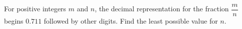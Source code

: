For positive integers $m$ and $n$, the decimal representation for the fraction $\dfrac{m}{n}$ begins $0.711$ followed by other digits. Find the least possible value for $n$.
